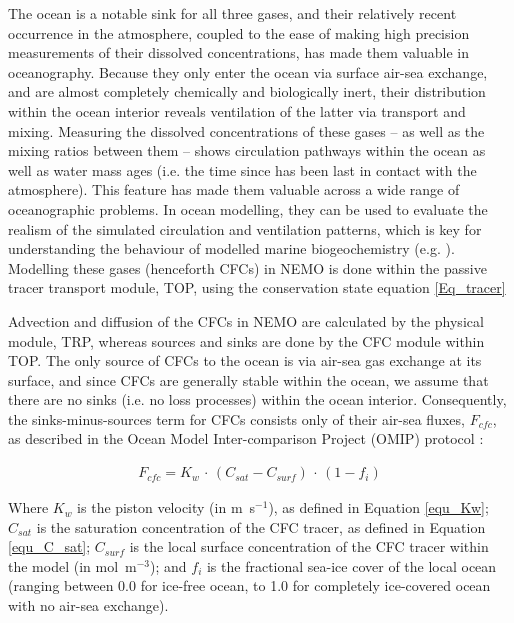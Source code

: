 \documentclass[../main/TOP_manual]{subfiles}
\begin{document}
The ocean is a notable sink for all three gases, and their relatively recent occurrence in the atmosphere, coupled to the ease of making high precision measurements of their dissolved concentrations, has made them
valuable in oceanography. %
Because they only enter the ocean via surface air-sea exchange, and are almost completely chemically and biologically inert, their distribution within the ocean interior reveals ventilation of the latter via transport and mixing.
Measuring the dissolved concentrations of these gases -- as well as the mixing ratios between them -- shows circulation pathways within the ocean as well as water mass ages (i.e. the time since has been last in contact with the
atmosphere).
This feature has made them valuable across a wide range of oceanographic problems.
In ocean modelling, they can be used to evaluate the realism of the simulated circulation and
ventilation patterns, which is key for understanding the behaviour of modelled marine biogeochemistry (e.g. \citep{dutay_2002,palmieri_2015}). \\

Modelling these gases (henceforth CFCs) in NEMO is done within the passive tracer transport module, TOP, using the conservation state equation \autoref{Eq_tracer}

Advection and diffusion of the CFCs in NEMO are calculated by the physical module, TRP,
whereas sources and sinks are done by the CFC module within TOP.
The only source of CFCs to the ocean is via air-sea gas exchange at its surface, and since CFCs are generally
stable within the ocean, we assume that there are no sinks (i.e. no loss processes) within the ocean interior.
Consequently, the sinks-minus-sources term for CFCs consists only of their air-sea fluxes, $F_{cfc}$, as
described in the Ocean Model Inter-comparison Project (OMIP) protocol \citep{orr_2017}:


\begin{eqnarray}
F_{cfc} = K_{w} \, \cdot \, (C_{sat} - C_{surf}) \, \cdot  \, (1 - f_{i})
\label{equ_CFC_flux}
\end{eqnarray}

Where $K_{w}$ is the piston velocity (in m~s$^{-1}$), as defined in Equation \autoref{equ_Kw};
$C_{sat}$ is the saturation concentration of the CFC tracer, as defined in Equation \autoref{equ_C_sat};
$C_{surf}$ is the local surface concentration of the CFC tracer within the model (in mol~m$^{-3}$);
and $f_{i}$ is the fractional sea-ice cover of the local ocean (ranging between 0.0 for ice-free ocean,
 to 1.0 for completely ice-covered ocean with no air-sea exchange).
\end{document}
